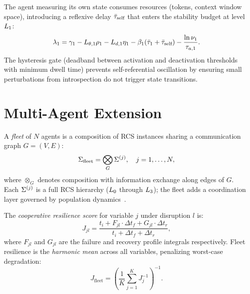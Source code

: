 \documentclass[11pt,a4paper]{article}
\begin{document}
\begin{remark}
The agent measuring its own state consumes resources (tokens, context window
space), introducing a reflexive delay $\bar{\tau}_{\text{self}}$ that enters the
stability budget at level $L_{1}$:
\begin{equation}
  \stab_1 = \decay_1 - L_{\param,1}\rho_1 - L_{d,1}\eta_1
  - \beta_1(\taubar_1 + \taubar_{\text{self}})
  - \frac{\ln\nu_1}{\taua[1]}.
\end{equation}
The hysteresis gate (deadband between activation and deactivation thresholds
with minimum dwell time) prevents self-referential oscillation by ensuring
small perturbations from introspection do not trigger state transitions.
\end{remark}


\section{Multi-Agent Extension}
\label{sec:fleet}

\begin{definition}
\label{def:fleet}
A \emph{fleet} of $N$ agents is a composition of RCS instances sharing a
communication graph $G = (V, E)$:
\begin{equation}
  \Sigma_{\text{fleet}} = \bigotimes_{G} \Sigma^{(j)},
  \quad j = 1, \ldots, N,
\end{equation}
where $\otimes_G$ denotes composition with information exchange along edges
of $G$.  Each $\Sigma^{(j)}$ is a full RCS hierarchy ($L_{0}$ through
$L_{3}$); the fleet adds a coordination layer governed by population
dynamics~\cite{quijano2017population}.
\end{definition}

\begin{definition}
\label{def:resilience}
The \emph{cooperative resilience score} for variable $j$ under disruption $l$
is:
\begin{equation}
  J_{jl} = \frac{t_i + F_{jl} \cdot \Delta t_f + G_{jl} \cdot \Delta t_r}
  {t_i + \Delta t_f + \Delta t_r},
\end{equation}
where $F_{jl}$ and $G_{jl}$ are the failure and recovery profile integrals
respectively.  Fleet resilience is the \emph{harmonic mean} across all
variables, penalizing worst-case degradation:
\begin{equation}
  J_{\text{fleet}} = \left(\frac{1}{K} \sum_{j=1}^{K} J_j^{-1}\right)^{-1}.
\end{equation}
\end{definition}
\end{document}
